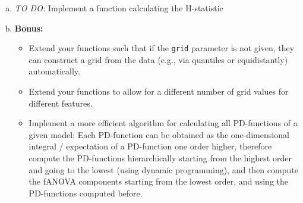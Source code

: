 {\begin{enumerate}[a)]
    \item
    \textit{TO DO:}
    Implement a function calculating the H-statistic

    \item \textbf{Bonus:}
    \begin{itemize}
        \item Extend your functions such that if the \texttt{grid} parameter is not given, they can construct a grid from the data (e.g., via quantiles or equidistantly) automatically.
        \item Extend your functions to allow for a different number of grid values for different features.
        \item Implement a more efficient algorithm for calculating all PD-functions of a given model: Each PD-function can be obtained as the one-dimensional integral / expectation of a PD-function one order higher, therefore compute the PD-functions hierarchically starting from the highest order and going to the lowest (using dynamic programming), and then compute the fANOVA components starting from the lowest order, and using the PD-functions computed before.
    \end{itemize}
    
        
\end{enumerate}
    
}